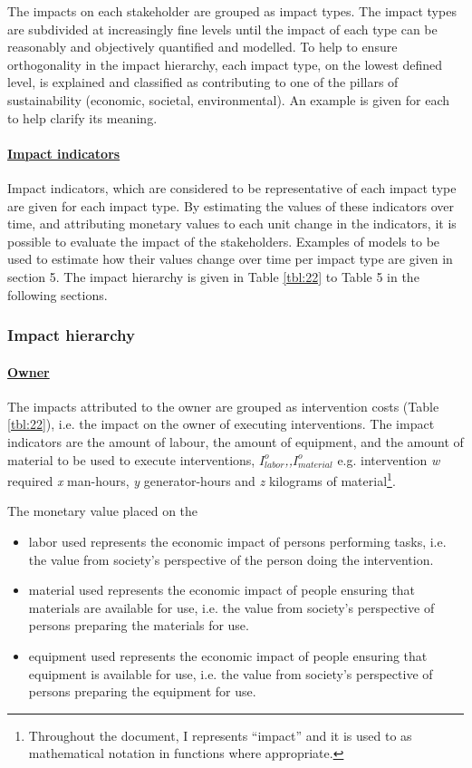 The impacts on each stakeholder are grouped as impact types. The impact types are subdivided at increasingly fine levels until the impact of each type can be reasonably and objectively quantified and modelled. To help to ensure orthogonality in the impact hierarchy, each impact type, on the lowest defined level, is explained and classified as contributing to one of the pillars of sustainability (economic, societal, environmental). An example is given for each to help clarify its meaning. 

\paragraph{\underline{Impact indicators}}

Impact indicators, which are considered to be representative of each impact type are given for each impact type. By estimating the values of these indicators over time, and attributing monetary values to each unit change in the indicators, it is possible to evaluate the impact of the stakeholders. Examples of models to be used to estimate how their values change over time per impact type are given in section 5. The impact hierarchy is given in Table \ref{tbl:22} to Table 5 in the following sections.

\subsubsection{Impact hierarchy}

\paragraph{\underline{Owner}}

The impacts attributed to the owner are grouped as intervention costs (Table \ref{tbl:22}), i.e. the impact on the owner of executing interventions. The impact indicators are the amount of labour, the amount of equipment, and the amount of material to be used to execute interventions, $I_{labor}^o$\textit{,,}$I_{material}^o$ e.g. intervention \textit{w} required \textit{x} man-hours, \textit{y} generator-hours and \textit{z} kilograms of material\footnote{Throughout the document, I represents ``impact'' and it is used to as mathematical notation in functions where appropriate.}. 

The monetary value placed on the 

\begin{itemize}
	\item labor used represents the economic impact of persons performing tasks, i.e. the value from society's perspective of the person doing the intervention. 
	\item material used represents the economic impact of people ensuring that materials are available for use, i.e. the value from society's perspective of persons preparing the materials for use. 
	\item equipment used represents the economic impact of people ensuring that equipment is available for use, i.e. the value from society's perspective of persons preparing the equipment for use.
\end{itemize}

